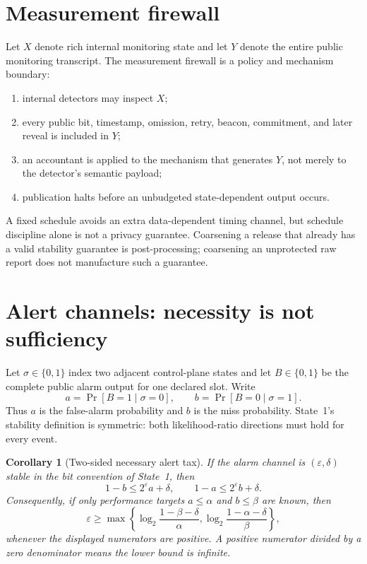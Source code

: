\documentclass[11pt]{article}
\newtheorem{corollary}{Corollary}
\begin{document}
\section{Measurement firewall}

Let $X$ denote rich internal monitoring state and let $Y$ denote the entire public monitoring transcript.
The measurement firewall is a policy and mechanism boundary:
\begin{enumerate}[leftmargin=*]
\item internal detectors may inspect $X$;
\item every public bit, timestamp, omission, retry, beacon, commitment, and later reveal is included in $Y$;
\item an accountant is applied to the mechanism that generates $Y$, not merely to the detector's semantic payload;
\item publication halts before an unbudgeted state-dependent output occurs.
\end{enumerate}
A fixed schedule avoids an extra data-dependent timing channel, but schedule discipline alone is not a privacy guarantee.
Coarsening a release that already has a valid stability guarantee is post-processing; coarsening an unprotected raw report does not manufacture such a guarantee.\cite{dworkroth2014foundations,nist_sp800_226}

\section{Alert channels: necessity is not sufficiency}

Let $\sigma\in\{0,1\}$ index two adjacent control-plane states and let $B\in\{0,1\}$ be the complete public alarm output for one declared slot.
Write
\[
a=\Pr[B=1\mid\sigma=0],\qquad b=\Pr[B=0\mid\sigma=1].
\]
Thus $a$ is the false-alarm probability and $b$ is the miss probability.
State~1's stability definition is symmetric: both likelihood-ratio directions must hold for every event.\cite{series:state1}

\begin{corollary}[Two-sided necessary alert tax]
\label{cor:alert-tax}
If the alarm channel is $(\varepsilon,\delta)$ stable in the bit convention of State~1, then
\[
1-b\le 2^\varepsilon a+\delta,
\qquad
1-a\le 2^\varepsilon b+\delta.
\]
Consequently, if only performance targets $a\le\alpha$ and $b\le\beta$ are known, then
\[
\varepsilon\ge
\max\!\left\{
\log_2\!\frac{1-\beta-\delta}{\alpha},
\log_2\!\frac{1-\alpha-\delta}{\beta}
\right\},
\tag{1}
\]
whenever the displayed numerators are positive.  A positive numerator divided by a zero denominator means the lower bound is infinite.
\end{corollary}
\end{document}
